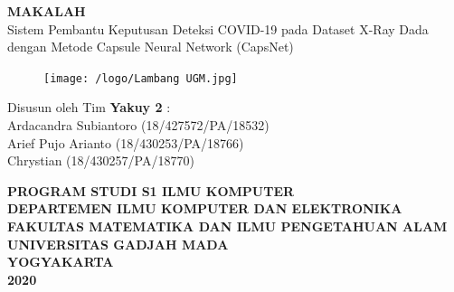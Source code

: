 \documentclass{article}
\begin{document}
  \begin{titlepage}
    \begin{center}
      
      \null
      {
      \huge \bfseries MAKALAH}\\
      [1cm]
      {\LARGE Sistem Pembantu Keputusan Deteksi COVID-19 pada Dataset X-Ray Dada dengan Metode Capsule Neural Network (CapsNet)}\\
          
      \vspace{2cm}

      \begin{figure}[H]
        \centering
        \texttt{[image: /logo/Lambang UGM.jpg]}
      \end{figure}
          
      \vspace{3cm}
    
      {\Large 
      Disusun oleh Tim \bfseries Yakuy 2} {\Large :\\
      \vspace{0.5cm}
      Ardacandra Subiantoro (18/427572/PA/18532)\\
      Arief Pujo Arianto (18/430253/PA/18766)\\
      Chrystian (18/430257/PA/18770)\\
      }


      \vspace{2cm}

      {\normalsize \bfseries
      PROGRAM STUDI S1 ILMU KOMPUTER\\
      DEPARTEMEN ILMU KOMPUTER DAN ELEKTRONIKA\\
      FAKULTAS MATEMATIKA DAN ILMU PENGETAHUAN ALAM\\
      UNIVERSITAS GADJAH MADA\\
      YOGYAKARTA\\
      \vspace{0.2cm}
      2020
      }
            
    \end{center}
  \end{titlepage}


  \newpage
\end{document}
